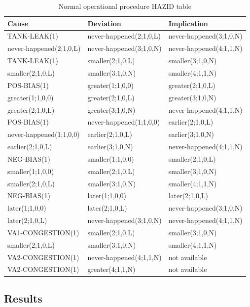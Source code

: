 \documentclass[conference]{IEEEtran}
\begin{document}
\begin{table}
\label{tab:normalophazid}
\begin{tabular}{|l|l|l|}
\hline
Cause & Deviation & Implication \\
\hline
TANK-LEAK(1) & never-happened(2;1,0,L) & never-happened(3;1,0,N) \\
never-happened(2;1,0,L) & never-happened(3;1,0,N) & never-happened(4;1,1,N) \\
TANK-LEAK(1) & smaller(2;1,0,L) & smaller(3;1,0,N) \\
smaller(2;1,0,L) & smaller(3;1,0,N) & smaller(4;1,1,N) \\
POS-BIAS(1) & greater(1;1,0,0) & greater(2;1,0,L) \\
greater(1;1,0,0) & greater(2;1,0,L) & greater(3;1,0,N) \\
greater(2;1,0,L) & greater(3;1,0,N) & never-happened(4;1,1,N) \\
POS-BIAS(1) & never-happened(1;1,0,0) & earlier(2;1,0,L) \\
never-happened(1;1,0,0) & earlier(2;1,0,L) & earlier(3;1,0,N) \\
earlier(2;1,0,L) & earlier(3;1,0,N) & never-happened(4;1,1,N) \\
NEG-BIAS(1) & smaller(1;1,0,0) & smaller(2;1,0,L) \\
smaller(1;1,0,0) & smaller(2;1,0,L) & smaller(3;1,0,N) \\
smaller(2;1,0,L) & smaller(3;1,0,N) & smaller(4;1,1,N) \\
NEG-BIAS(1) & later(1;1,0,0) & later(2;1,0,L) \\
later(1;1,0,0) & later(2;1,0,L) & never-happened(3;1,0,N) \\
later(2;1,0,L) & never-happened(3;1,0,N) & never-happened(4;1,1,N) \\
VA1-CONGESTION(1) & smaller(2;1,0,L) & smaller(3;1,0,N) \\
smaller(2;1,0,L) & smaller(3;1,0,N) & smaller(4;1,1,N) \\
VA2-CONGESTION(1) & never-happened(4;1,1,N) & not available \\
VA2-CONGESTION(1) & greater(4;1,1,N) & not available \\
\hline
\end{tabular}
\caption{Normal operational procedure HAZID table}
\end{table}

\subsection{Results}
\end{document}
